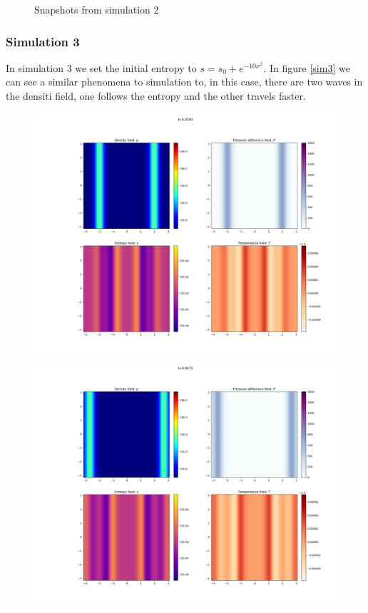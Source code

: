 \documentclass{article}
\begin{document}
\begin{figure}[h]
    \caption{Snapshots from simulation 2}
    \label{sim2}
\end{figure}

\subsubsection{Simulation 3}
In simulation 3 we set the initial entropy to \(s = s_0 + e^{-10x^2}\).
In figure \ref{sim3} we can see a similar phenomena to simulation to, in this case, there are two waves in the densiti field, one follows the entropy and the other travels faster.

\begin{figure}[h]
    \includegraphics[width=\textwidth/3]{Sim 2/SF02_0020.png}
    \includegraphics[width=\textwidth/3]{Sim 2/SF02_0027.png}

\end{figure}
\end{document}
